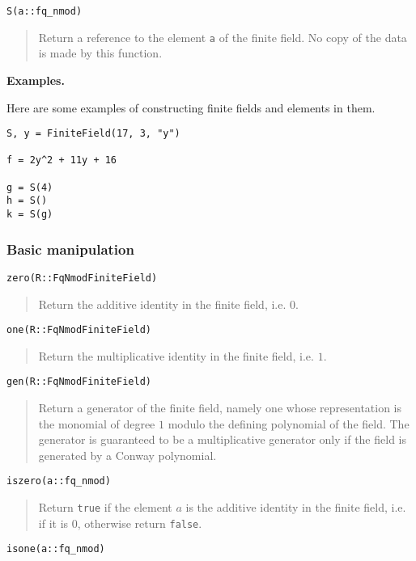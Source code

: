 \documentclass[a4paper,10pt]{article}
\newcommand{\code}{\lstinline}
\newcommand{\desc}[1]{\vspace{-3mm}\begin{quote}#1\end{quote}}
\begin{document}
{{\begin{lstlisting}
S(a::fq_nmod)
\end{lstlisting}

\desc{Return a reference to the element \code{a} of the finite field. No copy
of the data is made by this function.}

\textbf{Examples.}

Here are some examples of constructing finite fields and elements in them.

\begin{lstlisting}
S, y = FiniteField(17, 3, "y")

f = 2y^2 + 11y + 16

g = S(4)
h = S()
k = S(g)
\end{lstlisting}

\subsubsection{Basic manipulation}

\begin{lstlisting}
zero(R::FqNmodFiniteField)
\end{lstlisting}

\desc{Return the additive identity in the finite field, i.e. $0$.}

\begin{lstlisting}
one(R::FqNmodFiniteField)
\end{lstlisting}

\desc{Return the multiplicative identity in the finite field, i.e. $1$.}

\begin{lstlisting}
gen(R::FqNmodFiniteField)
\end{lstlisting}

\desc{Return a generator of the finite field, namely one whose
representation is the monomial of degree $1$ modulo the defining
polynomial of the field. The generator is guaranteed to be a multiplicative 
generator only if the field is generated by a Conway polynomial.}

\begin{lstlisting}
iszero(a::fq_nmod)
\end{lstlisting}

\desc{Return \code{true} if the element $a$ is the additive identity in the
finite field, i.e. if it is $0$, otherwise return \code{false}.}

\begin{lstlisting}
isone(a::fq_nmod)
\end{lstlisting}

}}
\end{document}
